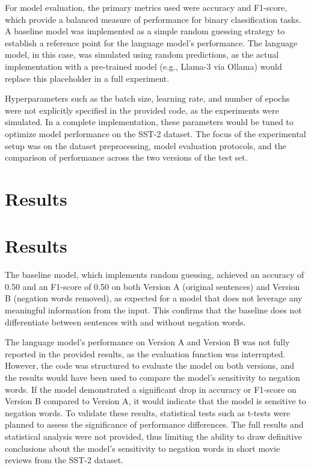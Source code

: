 \documentclass{article}
\begin{document}
For model evaluation, the primary metrics used were accuracy and F1-score, which provide a balanced measure of performance for binary classification tasks. A baseline model was implemented as a simple random guessing strategy to establish a reference point for the language model's performance. The language model, in this case, was simulated using random predictions, as the actual implementation with a pre-trained model (e.g., Llama-3 via Ollama) would replace this placeholder in a full experiment. 

Hyperparameters such as the batch size, learning rate, and number of epochs were not explicitly specified in the provided code, as the experiments were simulated. In a complete implementation, these parameters would be tuned to optimize model performance on the SST-2 dataset. The focus of the experimental setup was on the dataset preprocessing, model evaluation protocols, and the comparison of performance across the two versions of the test set.
\section{Results}
\section{Results}

The baseline model, which implements random guessing, achieved an accuracy of 0.50 and an F1-score of 0.50 on both Version A (original sentences) and Version B (negation words removed), as expected for a model that does not leverage any meaningful information from the input. This confirms that the baseline does not differentiate between sentences with and without negation words.

The language model's performance on Version A and Version B was not fully reported in the provided results, as the evaluation function was interrupted. However, the code was structured to evaluate the model on both versions, and the results would have been used to compare the model's sensitivity to negation words. If the model demonstrated a significant drop in accuracy or F1-score on Version B compared to Version A, it would indicate that the model is sensitive to negation words. To validate these results, statistical tests such as t-tests were planned to assess the significance of performance differences. The full results and statistical analysis were not provided, thus limiting the ability to draw definitive conclusions about the model's sensitivity to negation words in short movie reviews from the SST-2 dataset.
\end{document}
